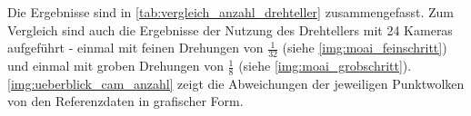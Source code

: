 \documentclass[./00PhotoBox.tex]{subfiles}
\begin{document}
Die Ergebnisse sind in \autoref{tab:vergleich_anzahl_drehteller} zusammengefasst. Zum Vergleich sind auch die Ergebnisse der Nutzung des Drehtellers mit 24 Kameras aufgeführt - einmal mit feinen Drehungen von $\frac{1}{32}$ (siehe \autoref{img:moai_feinschritt}) und einmal mit groben Drehungen von $\frac{1}{8}$ (siehe \autoref{img:moai_grobschritt}). \autoref{img:ueberblick_cam_anzahl} zeigt die Abweichungen der jeweiligen Punktwolken von den Referenzdaten in grafischer Form.

\begin{table}[htbp]
    \centering
    \caption{Ergebnisse mit unterschiedlicher Kameraanzahl und teilweise Nutzung eines Drehtellers}
    \label{tab:vergleich_anzahl_drehteller}
\end{table}
\end{document}
